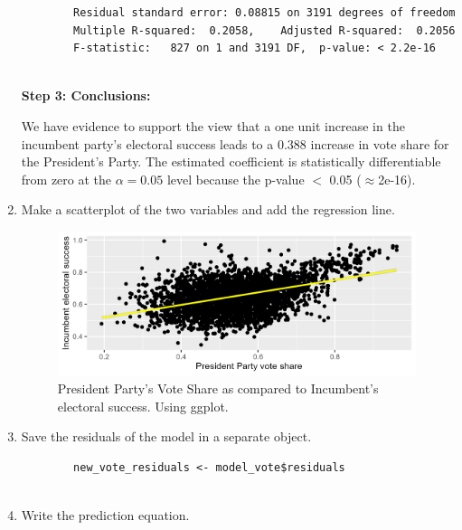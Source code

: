 \documentclass[12pt,letterpaper]{article}
\begin{document}
\begin{enumerate}
\begin{verbatim}
		Residual standard error: 0.08815 on 3191 degrees of freedom
		Multiple R-squared:  0.2058,	Adjusted R-squared:  0.2056 
		F-statistic:   827 on 1 and 3191 DF,  p-value: < 2.2e-16
		
	\end{verbatim}
	
	\textbf{Step 3: Conclusions:}
	
	We have evidence to support the view that a one unit increase in the incumbent party's electoral success leads to a 0.388 increase in vote share for the President's Party. The estimated coefficient is statistically differentiable from zero at the $\alpha=0.05$ level because the p-value $<$ 0.05 ($\approx $2e-16). \\
	
	
	\item Make a scatterplot of the two variables and add the regression line. 	
	
	  
	
	\begin{figure}[h!]
		\centering
		\caption{\footnotesize President Party's Vote Share as compared to Incumbent's electoral success. Using ggplot.}
		\includegraphics[width=0.99\textwidth]{vote_share2_scatter.png}
		
	\end{figure} 
	
	\newpage
	
	\item Save the residuals of the model in a separate object.	
	
	\begin{verbatim}
		new_vote_residuals <- model_vote$residuals
		
	\end{verbatim}
	
	
	\item Write the prediction equation.
	
\end{enumerate}		
\end{document}
